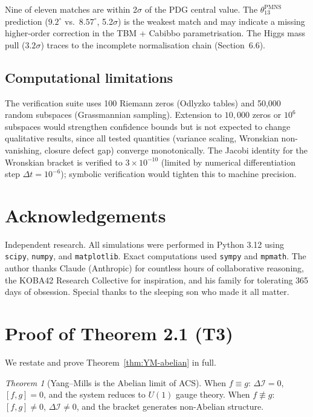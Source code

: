 \documentclass[11pt,a4paper]{article}
\theoremstyle{plain}
\theoremstyle{definition}
\theoremstyle{remark}
\newtheorem*{theorem*}{Theorem}
\newcommand{\DI}{\Delta\mathcal{I}}
\begin{document}
\noindent
Nine of eleven matches are within 2$\sigma$ of the PDG central value.
The $\theta_{13}^{\mathrm{PMNS}}$ prediction ($9.2^\circ$ vs.\ $8.57^\circ$, 5.2$\sigma$) is the
weakest match and may indicate a missing higher-order correction in the TBM + Cabibbo
parametrisation.  The Higgs mass pull ($3.2\sigma$) traces to the
incomplete normalisation chain (Section~6.6).

\subsection*{Computational limitations}

The verification suite uses 100 Riemann zeros (Odlyzko tables) and
50{,}000 random subspaces (Grassmannian sampling).  Extension to
$10{,}000$ zeros or $10^6$ subspaces would strengthen confidence bounds
but is not expected to change qualitative results, since all tested
quantities (variance scaling, Wronskian non-vanishing, closure defect
gap) converge monotonically.  The Jacobi identity for the Wronskian
bracket is verified to $3 \times 10^{-10}$ (limited by numerical
differentiation step $\Delta t = 10^{-6}$); symbolic verification
would tighten this to machine precision.

\section*{Acknowledgements}

Independent research.  All simulations were performed in Python 3.12 
using \texttt{scipy}, \texttt{numpy}, and \texttt{matplotlib}.  Exact
computations used \texttt{sympy} and \texttt{mpmath}.  The author thanks
Claude (Anthropic) for countless hours of collaborative reasoning, the
KOBA42 Research Collective for inspiration, and his family for tolerating
365 days of obsession.  Special thanks to the sleeping son who made it all
matter.

\appendix

\clearpage
\section{Proof of Theorem 2.1 (T3)}
\label{app:T3}

We restate and prove Theorem~\ref{thm:YM-abelian} in full.

\begin{theorem*}[Yang--Mills is the Abelian limit of ACS]
When $f \equiv g$: $\DI = 0$, $[f,g] = 0$, and the system reduces to 
$U(1)$ gauge theory.  When $f \not\equiv g$: $[f,g] \neq 0$, 
$\DI \neq 0$, and the bracket generates non-Abelian structure.
\end{theorem*}
\end{document}
